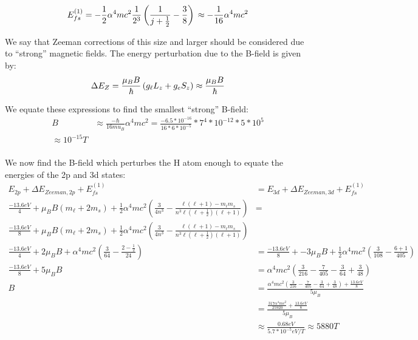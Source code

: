 \documentclass[10pt]{article} %
\begin{document}
\begin{equation*}
  E_{fs}^{(1)}
  = -\frac{1}{2}\alpha^4mc^2\frac{1}{2^3}\left(\frac{1}{j+\frac{1}{2}}-\frac{3}{8}\right)\\
  \approx -\frac{1}{16}\alpha^4mc^2\\
\end{equation*}

We say that Zeeman corrections of this size and larger should be considered due to ``strong''
magnetic fields. The energy perturbation due to the B-field is given by:\\

\begin{equation*}
  \Delta E_{Z} = \frac{\mu_B B}{\hbar}\left(g_\ell L_z + g_e S_z\right)
  \approx \frac{\mu_B B}{\hbar}\\
\end{equation*}

We equate these expressions to find the smallest ``strong'' B-field:\\

\begin{align*}
  B &\approx \frac{-\hbar}{16mu_B}\alpha^4mc^2
  = \frac{-6.5*10^{-16}}{16*6*10^{-5}}*7^4*10^{-12}*5*10^5\\
  \approx 10^{-15}T\\
\end{align*}

We now find the B-field which perturbes the H atom enough to equate the energies of the 2p and 3d
states:\\

\begin{align*}
  E_{2p} + \Delta E_{Zeeman, 2p} + E_{fs}^{(1)} &= E_{3d} + \Delta E_{Zeeman, 3d} + E_{fs}^{(1)}\\
  \frac{-13.6eV}{4} + \mu_BB(m_\ell+2m_s)
  + \frac{1}{2}\alpha^4mc^2\left(\frac{3}{4n^3}
  -\frac{\ell(\ell+1)-m_\ell m_s}{n^3\ell(\ell+\frac{1}{2})(\ell+1)}\right)
  &=\\ \frac{-13.6eV}{8} + \mu_BB(m_\ell+2m_s) + \frac{1}{2}\alpha^4mc^2\left(\frac{3}{4n^3}
  -\frac{\ell(\ell+1)-m_\ell m_s}{n^3\ell(\ell+\frac{1}{2})(\ell+1)}\right)\\
  \frac{-13.6eV}{4} + 2\mu_BB
  + \alpha^4mc^2\left(\frac{3}{64}
  -\frac{2-\frac{1}{2}}{24}\right)
  &= \frac{-13.6eV}{8} + -3\mu_BB + \frac{1}{2}\alpha^4mc^2\left(\frac{3}{108}
  -\frac{6+1}{405}\right)\\
  \frac{-13.6eV}{8} + 5\mu_BB
  &= \alpha^4mc^2
  \left(\frac{3}{216} - \frac{7}{405} - \frac{3}{64} + \frac{3}{48}\right)\\
  B &= \frac{\alpha^4mc^2
    \left(\frac{3}{216} - \frac{7}{405} - \frac{3}{64} + \frac{3}{48}\right) + \frac{13.6eV}{8}}{5\mu_B}\\
  &= \frac{\frac{317\alpha^4mc^2}{25920} + \frac{13.6eV}{8}}{5\mu_B}\\
  &\approx \frac{0.68eV}{5.7*10^{-5}eV/T} \approx 5880 T\\
\end{align*}
\end{document}
